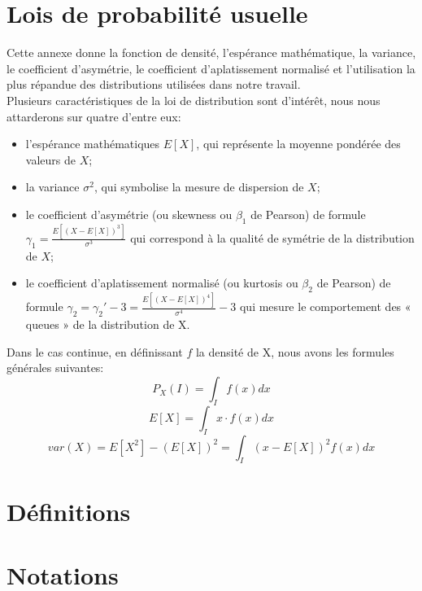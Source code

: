 \documentclass[a4paper, oneside, 12pt]{book}
\begin{document}
\newpage
\begin{thebibliography}{99}



\end{thebibliography}



\begin{appendix}
\setcounter{page}{1}

\chapter{Lois de probabilité usuelle}
\label{Lois de probabilité}
Cette annexe donne la fonction de densité, l'espérance mathématique, la variance, le coefficient d’asymétrie, le coefficient d’aplatissement normalisé et l'utilisation la plus répandue des distributions utilisées dans notre travail.\\
Plusieurs caractéristiques de la loi de distribution sont d’intérêt, nous nous attarderons sur quatre d’entre eux:
\begin{itemize}
	\item l’espérance mathématiques $E[X]$, qui représente la moyenne pondérée des valeurs de $X$;
	\item la variance $\sigma^2$, qui symbolise la mesure de dispersion de $X$;
	\item le coefficient d’asymétrie (ou skewness ou $\beta_1$ de Pearson) de formule $\gamma_1 = \frac{E[(X - E[X]) ^3]}{\sigma ^3}$ qui correspond à la qualité de symétrie de la distribution de $X$;
	\item le coefficient d’aplatissement normalisé (ou kurtosis ou $\beta_2$ de Pearson) de formule $\gamma_2 = \gamma_2 ' - 3 = \frac{E[(X - E[X]) ^4]}{\sigma ^4} - 3$ qui mesure le comportement des « queues » de la distribution de X.	
\end{itemize}
Dans le cas continue, en définissant $f$ la densité de X,  nous avons les formules générales suivantes: 
$$
P_X (I) = \int_I f(x) dx
$$
$$
E[X] = \int_I x \cdot f(x) dx
$$
$$
var (X) = E[X ^2] - (E[X])^2 = \int_I (x - E[X])^2 f(x) dx
$$

\chapter{Définitions}
\label{Définitions}
\chapter{Notations}
\label{Notations}

\end{appendix}
\end{document}
